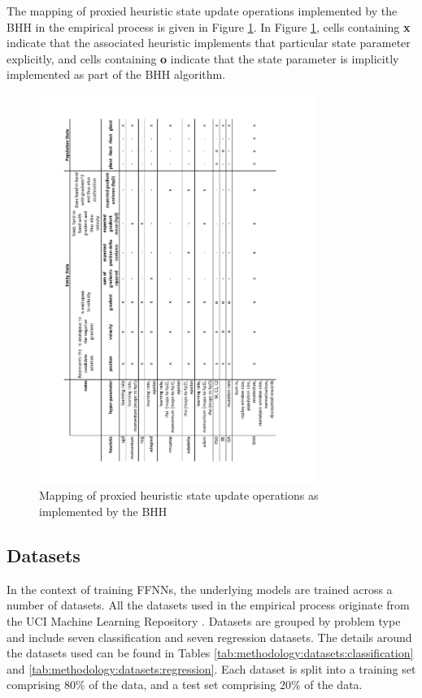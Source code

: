 \documentclass[preprint,review,12pt]{elsarticle}
\begin{document}
The mapping of proxied heuristic state update operations implemented by the \acs{BHH} in the empirical process is given in Figure \ref{fig:methodology:heuristics:proxies}. In Figure \ref{fig:methodology:heuristics:proxies}, cells containing \textbf{x} indicate that the associated heuristic implements that particular state parameter explicitly, and cells containing \textbf{o} indicate that the state parameter is implicitly implemented as part of the \acs{BHH} algorithm.

\begin{figure}[htbp]
	\centering
	\includegraphics[width=0.8\textwidth]{bhh_heuristic_proxies.pdf}
	\caption{Mapping of proxied heuristic state update operations as implemented by the \acs{BHH}}
	\label{fig:methodology:heuristics:proxies}%
\end{figure}


\subsection{Datasets}\label{sec:methodology:datasets}

In the context of training \acp{FFNN}, the underlying models are trained across a number of datasets. All the datasets used in the empirical process originate from the UCI Machine Learning Repository \citep{ref:uci:2022}. Datasets are grouped by problem type and include seven classification and seven regression datasets. The details around the datasets used can be found in Tables \ref{tab:methodology:datasets:classification} and \ref{tab:methodology:datasets:regression}. Each dataset is split into a training set comprising 80\% of the data, and a test set comprising 20\% of the data.
\end{document}
